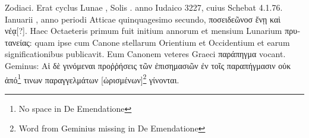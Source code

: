 Zodiaci.
Erat cyclus Lunae ,
 Solis . anno Iudaico 3227, cuius
Schebat 4.1.76. Ianuarii , anno periodi Atticae quinquagesimo
secundo, \textgreek{ποσειδεῶνοσ ἔνῃ καὶ νέᾳ[?]}.
Haec Octaeteris primum fuit initium annorum
et mensium Lunarium \textgreek{πρυτανείας}: quam ipse cum Canone stellarum
Orientium et Occidentium et earum significationibus publicavit.
Eum Canonem veteres Graeci
\textgreek{παράπηγμα} vocant.
Geminus: \textgreek{Αἱ δὲ
γινόμεναι προῤῥήσεις τῶν ἐπισημασιῶν ἐν τοῖς
παραπήγμασιν οὐκ ἀπό\footnote{No space in De Emendatione} τινων παραγγελμάτων
[ὡρισμένων]\footnote{Word from Geminius missing in De Emendatione} γίνονται}.

